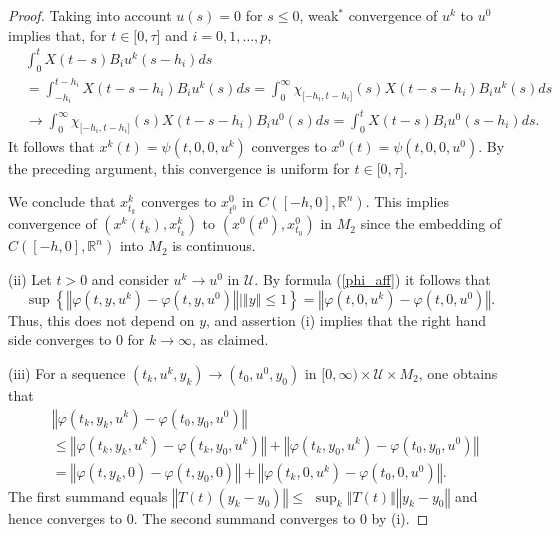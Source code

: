\documentclass{siamltex}%
\begin{document}
\begin{proof}
Taking into account $u(s)=0$ for $s\leq0$, weak$^{\ast}$ convergence of
$u^{k}$ to $u^{0}$ implies that, for $t\in\lbrack0,\tau]$ and $i=0,1,\ldots
,p$,%
\begin{align*}
&  \int_{0}^{t}X(t-s)B_{i}u^{k}(s-h_{i})ds\\
&  =\int_{-h_{i}}^{t-h_{i}}X(t-s-h_{i})B_{i}u^{k}(s)ds=\int_{0}^{\infty}%
\chi_{\lbrack-h_{i},t-h_{i}]}(s)X(t-s-h_{i})B_{i}u^{k}(s)ds\\
&  \longrightarrow\int_{0}^{\infty}\chi_{\lbrack-h_{i},t-h_{i}]}%
(s)X(t-s-h_{i})B_{i}u^{0}(s)ds=\int_{0}^{t}X(t-s)B_{i}u^{0}(s-h_{i})ds.
\end{align*}
It follows that $x^{k}(t)=\psi(t,0,0,u^{k})$ converges to $x^{0}%
(t)=\psi(t,0,0,u^{0})$. By the preceding argument, this convergence is uniform
for $t\in\lbrack0,\tau]$.

We conclude that $x_{t_{k}}^{k}$ converges to $x_{t^{0}}^{0}$ in
$C([-h,0],\mathbb{R}^{n})$. This implies convergence of $(x^{k}(t_{k}%
),x_{t_{k}}^{k})$ to $(x^{0}(t^{0}),x_{t_{0}}^{0})$ in $M_{2}$ since the
embedding of $C([-h,0],\mathbb{R}^{n})$ into $M_{2}$ is continuous.

(ii) Let $t>0$ and consider $u^{k}\rightarrow u^{0}$ in $\mathcal{U}$. By
formula (\ref{phi_aff}) it follows that%
\[
\sup\left\{  \left\Vert \varphi(t,y,u^{k})-\varphi(t,y,u^{0})\right\Vert
\left\vert \left\Vert y\right\Vert \leq1\right.  \right\}  =\left\Vert
\varphi(t,0,u^{k})-\varphi(t,0,u^{0})\right\Vert .
\]
Thus, this does not depend on $y$, and assertion (i) implies that the right
hand side converges to $0$ for $k\rightarrow\infty$, as claimed.

(iii) For a sequence $(t_{k},u^{k},y_{k})\rightarrow(t_{0},u^{0},y_{0})$ in
$[0,\infty)\times\mathcal{U}\times M_{2}$, one obtains that%
\begin{align*}
&  \left\Vert \varphi(t_{k},y_{k},u^{k})-\varphi(t_{0},y_{0},u^{0})\right\Vert
\\
&  \leq\left\Vert \varphi(t_{k},y_{k},u^{k})-\varphi(t_{k},y_{0}%
,u^{k})\right\Vert +\left\Vert \varphi(t_{k},y_{0},u^{k})-\varphi(t_{0}%
,y_{0},u^{0})\right\Vert \\
&  =\left\Vert \varphi(t,y_{k},0)-\varphi(t,y_{0},0)\right\Vert +\left\Vert
\varphi(t_{k},0,u^{k})-\varphi(t_{0},0,u^{0})\right\Vert .
\end{align*}
The first summand equals $\left\Vert T(t)(y_{k}-y_{0})\right\Vert \leq$
$\sup_{k}\left\Vert T(t)\right\Vert \left\Vert y_{k}-y_{0}\right\Vert $ and
hence converges to $0$. The second summand converges to $0$ by (i).
\end{proof}
\end{document}
